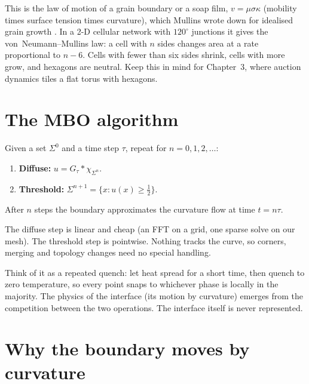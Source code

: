 \begin{physics}
This is the law of motion of a grain boundary or a soap film, $v = \mu\sigma\kappa$
(mobility times surface tension times curvature), which Mullins wrote down for
idealised grain growth \cite{mullins1956two}. In a 2-D cellular network with
$120^\circ$ junctions it gives the von~Neumann--Mullins law: a cell with $n$
sides changes area at a rate proportional to $n - 6$. Cells with fewer than six
sides shrink, cells with more grow, and hexagons are neutral. Keep this in mind
for Chapter~3, where auction dynamics tiles a flat torus with hexagons.
\end{physics}

\section{The MBO algorithm}
\label{sec:ch1-algorithm}

\begin{tcolorbox}[colback=white, colframe=black!60, title={Two-phase MBO
  \cite{merriman1992diffusion}}, fontupper=\small]
Given a set $\Sigma^0$ and a time step $\tau$, repeat for $n = 0, 1, 2, \dots$:
\begin{enumerate}[nosep]
  \item \textbf{Diffuse:} $u = G_\tau * \chi_{\Sigma^n}$.
  \item \textbf{Threshold:} $\Sigma^{n+1} = \{x : u(x) \ge \tfrac12\}$.
\end{enumerate}
After $n$ steps the boundary approximates the curvature flow at time $t = n\tau$.
\end{tcolorbox}

The diffuse step is linear and cheap (an FFT on a grid, one sparse solve on our
mesh). The threshold step is pointwise. Nothing tracks the curve, so corners,
merging and topology changes need no special handling.

\begin{physics}
Think of it as a repeated quench: let heat spread for a short time, then quench
to zero temperature, so every point snaps to whichever phase is locally in the
majority. The physics of the interface (its motion by curvature) emerges from
the competition between the two operations. The interface itself is never
represented.
\end{physics}

\section{Why the boundary moves by curvature}
\label{sec:ch1-why}

